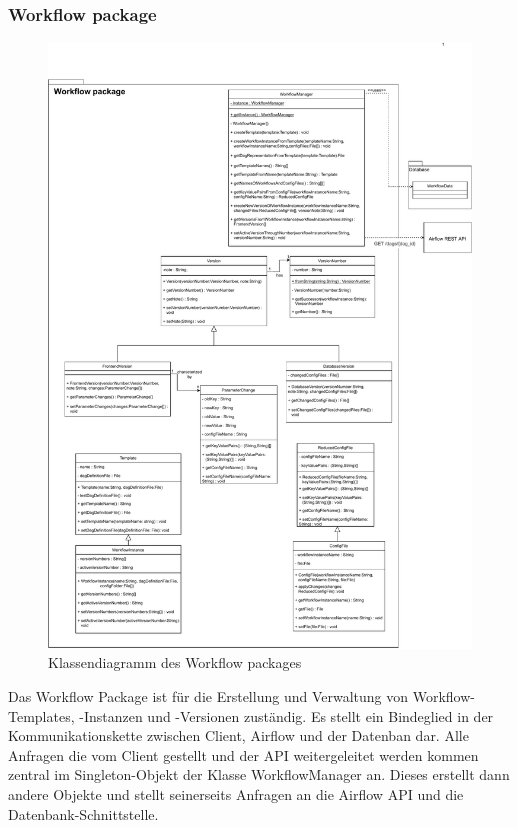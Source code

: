 \subsubsection{Workflow package}
\begin{figure}[h]
    \includegraphics[width=1\textwidth]{res/Klassen/wfPackage.pdf}
    \caption{Klassendiagramm des Workflow packages}
\end{figure}
Das Workflow Package ist für die Erstellung und Verwaltung von Workflow-Templates, -Instanzen und -Versionen zuständig.
Es stellt ein Bindeglied in der Kommunikationskette zwischen Client, Airflow und der Datenban dar.
Alle Anfragen die vom Client gestellt und der API weitergeleitet werden kommen zentral im Singleton-Objekt der Klasse WorkflowManager an.
Dieses erstellt dann andere Objekte und stellt seinerseits Anfragen an die Airflow API und die Datenbank-Schnittstelle.

